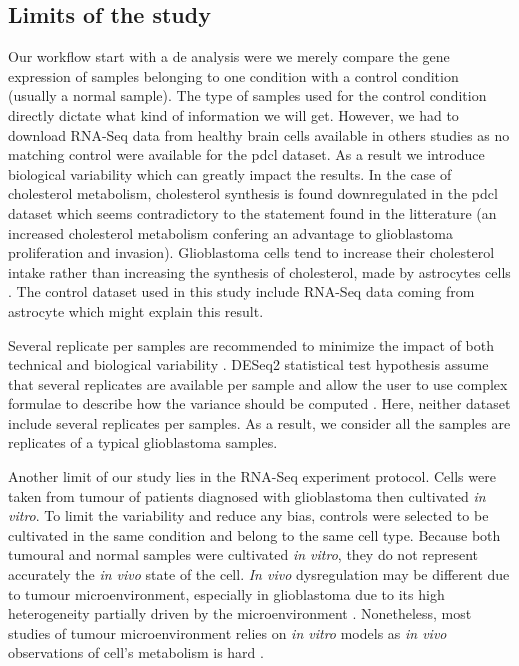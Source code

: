 \subsection{Limits of the study}

Our workflow start with a \acrlong{de} analysis were we merely compare the gene expression of samples belonging to one condition with a control condition (usually a normal sample).
The type of samples used for the control condition directly dictate what kind of information we will get.
However, we had to download RNA-Seq data from healthy brain cells available in others studies as no matching control were available for the \acrshort{pdcl} dataset.
As a result we introduce biological variability which can greatly impact the results.
In the case of cholesterol metabolism, cholesterol synthesis is found downregulated in the \acrshort{pdcl} dataset which seems contradictory to the statement found in the litterature (an increased cholesterol metabolism confering an advantage to glioblastoma proliferation and invasion).
Glioblastoma cells tend to increase their cholesterol intake rather than increasing the synthesis of cholesterol, made by astrocytes cells \cite*{Villa2016, Pirmoradi2019}.
The control dataset used in this study include RNA-Seq data coming from astrocyte which might explain this result.

Several replicate per samples are recommended to minimize the impact of both technical and biological variability \cite*{Conesa2016}.
DESeq2 statistical test hypothesis assume that several replicates are available per sample and allow the user to use complex formulae to describe how the variance should be computed \cite*{Love2014}.
Here, neither dataset include several replicates per samples.
As a result, we consider all the samples are replicates of a typical glioblastoma samples.

Another limit of our study lies in the RNA-Seq experiment protocol.
Cells were taken from tumour of patients diagnosed with glioblastoma then cultivated \textit{in vitro}.
To limit the variability and reduce any bias, controls were selected to be cultivated in the same condition and belong to the same cell type.
Because both tumoural and normal samples were cultivated \textit{in vitro}, they do not represent accurately the \textit{in vivo} state of the cell.
\textit{In vivo} dysregulation may be different due to tumour microenvironment, especially in glioblastoma due to its high heterogeneity partially driven by the microenvironment \cite*{Neftel2019}.
Nonetheless, most studies of tumour microenvironment relies on \textit{in vitro} models as \textit{in vivo} observations of cell's metabolism is hard \cite*{Xiao2019}.

